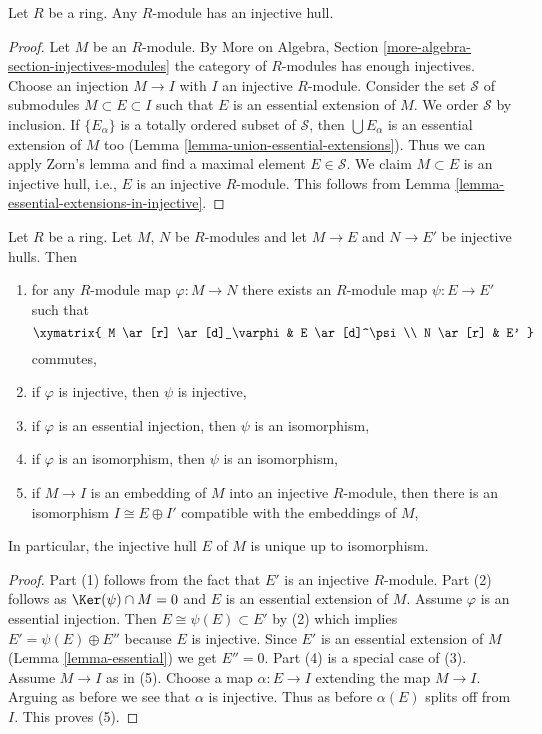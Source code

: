 \begin{lemma}
\label{lemma-injective-hull}
Let $R$ be a ring. Any $R$-module has an injective hull.
\end{lemma}

\begin{proof}
Let $M$ be an $R$-module. By
More on Algebra, Section \ref{more-algebra-section-injectives-modules}
the category of $R$-modules has enough injectives.
Choose an injection $M \to I$ with $I$ an injective $R$-module.
Consider the set $\mathcal{S}$ of submodules $M \subset E \subset I$
such that $E$ is an essential extension of $M$. We order $\mathcal{S}$
by inclusion. If $\{E_\alpha\}$ is a totally ordered subset
of $\mathcal{S}$, then $\bigcup E_\alpha$ is an essential extension of $M$
too (Lemma \ref{lemma-union-essential-extensions}).
Thus we can apply Zorn's lemma and find a maximal element
$E \in \mathcal{S}$. We claim $M \subset E$ is an injective hull, i.e.,
$E$ is an injective $R$-module. This follows from
Lemma \ref{lemma-essential-extensions-in-injective}.
\end{proof}

\begin{lemma}
\label{lemma-injective-hull-unique}
Let $R$ be a ring. Let $M$, $N$ be $R$-modules and let $M \to E$
and $N \to E'$ be injective hulls. Then
\begin{enumerate}
\item for any $R$-module map $\varphi : M \to N$ there exists an
$R$-module map $\psi : E \to E'$ such that
$$
\xymatrix{
M \ar[r] \ar[d]_\varphi & E \ar[d]^\psi \\
N \ar[r] & E'
}
$$
commutes,
\item if $\varphi$ is injective, then $\psi$ is injective,
\item if $\varphi$ is an essential injection, then $\psi$ is an isomorphism,
\item if $\varphi$ is an isomorphism, then $\psi$ is an isomorphism,
\item if $M \to I$ is an embedding of $M$ into an injective $R$-module,
then there is an isomorphism $I \cong E \oplus I'$ compatible with
the embeddings of $M$,
\end{enumerate}
In particular, the injective hull $E$ of $M$ is unique up to isomorphism.
\end{lemma}

\begin{proof}
Part (1) follows from the fact that $E'$ is an injective $R$-module.
Part (2) follows as $\Ker(\psi) \cap M = 0$
and $E$ is an essential extension of $M$.
Assume $\varphi$ is an essential injection. Then
$E \cong \psi(E) \subset E'$ by (2) which implies
$E' = \psi(E) \oplus E''$ because $E$ is injective.
Since $E'$ is an essential extension of
$M$ (Lemma \ref{lemma-essential}) we get $E'' = 0$.
Part (4) is a special case of (3).
Assume $M \to I$ as in (5).
Choose a map $\alpha : E \to I$ extending the map $M \to I$.
Arguing as before we see that $\alpha$ is injective.
Thus as before $\alpha(E)$ splits off from $I$.
This proves (5).
\end{proof}

